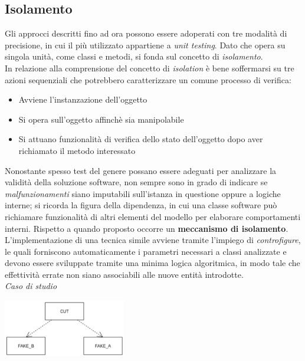 \documentclass{article}
\begin{document}
\subsection*{Isolamento}
\large
Gli approcci descritti fino ad ora possono essere adoperati con tre modalità di precisione, in cui il più utilizzato appartiene a \textit{unit testing}. Dato che opera su singola unità, come classi e metodi, si fonda sul concetto di \textit{isolamento}.\vspace*{14pt}\\
In relazione alla comprensione del concetto di \textit{isolation} è bene soffermarsi su tre azioni sequenziali che potrebbero caratterizzare un comune processo di verifica:
\begin{itemize}[label={-}]
    \itemsep0em
    \item Avviene l'instanzazione dell'oggetto
    \item Si opera sull'oggetto affinchè sia manipolabile
    \item Si attuano funzionalità di verifica dello stato dell'oggetto dopo aver richiamato il metodo interessato
\end{itemize}
Nonostante spesso test del genere possano essere adeguati per analizzare la validità della soluzione software, non sempre sono in grado di indicare se \textit{malfunzionamenti} siano imputabili sull'istanza in questione oppure a logiche interne; si ricorda la figura della dipendenza, in cui una classe software può richiamare funzionalità di altri elementi del modello per elaborare comportamenti interni. Rispetto a quando proposto occorre un \textbf{meccanismo di isolamento}.\vspace*{14pt}\\
L'implementazione di una tecnica simile avviene tramite l'impiego di \textit{controfigure}, le quali forniscono automaticamente i parametri necessari a classi analizzate e devono essere sviluppate tramite una minima logica algoritmica, in modo tale che effettività errate non siano associabili alle nuove entità introdotte.\vspace*{14pt}\\
\textit{Caso di studio}\\
\begin{center}
    \includegraphics[width=0.4\textwidth]{foto 2.png}
\end{center} 
\end{document}
